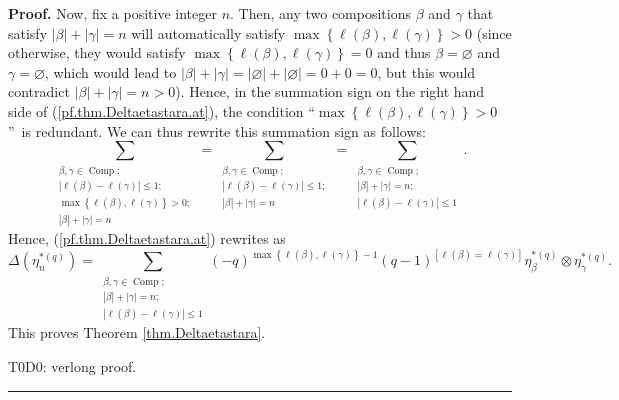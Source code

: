 \documentclass[numbers=enddot,12pt,final,onecolumn,notitlepage]{scrartcl}%
\theoremstyle{definition}
\newenvironment{proof}[1][Proof]{\noindent\textbf{#1.} }{\ \rule{0.5em}{0.5em}}
\let\sumnonlimits\sum
\renewcommand{\sum}{\sumnonlimits\limits}
\newenvironment{verlong}{}{}
\begin{document}
\begin{proof}
Now, fix a positive integer $n$. Then, any two compositions $\beta$ and
$\gamma$ that satisfy $\left\vert \beta\right\vert +\left\vert \gamma
\right\vert =n$ will automatically satisfy $\max\left\{  \ell\left(
\beta\right)  ,\ell\left(  \gamma\right)  \right\}  >0$ (since otherwise, they
would satisfy $\max\left\{  \ell\left(  \beta\right)  ,\ell\left(
\gamma\right)  \right\}  =0$ and thus $\beta=\varnothing$ and $\gamma
=\varnothing$, which would lead to $\left\vert \beta\right\vert +\left\vert
\gamma\right\vert =\left\vert \varnothing\right\vert +\left\vert
\varnothing\right\vert =0+0=0$, but this would contradict $\left\vert
\beta\right\vert +\left\vert \gamma\right\vert =n>0$). Hence, in the summation
sign on the right hand side of (\ref{pf.thm.Deltaetastara.at}), the condition
\textquotedblleft$\max\left\{  \ell\left(  \beta\right)  ,\ell\left(
\gamma\right)  \right\}  >0$\textquotedblright\ is redundant. We can thus
rewrite this summation sign as follows:%
\[
\sum_{\substack{\beta,\gamma\in\operatorname*{Comp};\\\left\vert \ell\left(
\beta\right)  -\ell\left(  \gamma\right)  \right\vert \leq1;\\\max\left\{
\ell\left(  \beta\right)  ,\ell\left(  \gamma\right)  \right\}
>0;\\\left\vert \beta\right\vert +\left\vert \gamma\right\vert =n}%
}=\sum_{\substack{\beta,\gamma\in\operatorname*{Comp};\\\left\vert \ell\left(
\beta\right)  -\ell\left(  \gamma\right)  \right\vert \leq1;\\\left\vert
\beta\right\vert +\left\vert \gamma\right\vert =n}}=\sum_{\substack{\beta
,\gamma\in\operatorname*{Comp};\\\left\vert \beta\right\vert +\left\vert
\gamma\right\vert =n;\\\left\vert \ell\left(  \beta\right)  -\ell\left(
\gamma\right)  \right\vert \leq1}}.
\]
Hence, (\ref{pf.thm.Deltaetastara.at}) rewrites as%
\[
\Delta\left(  \eta_{n}^{\ast\left(  q\right)  }\right)  =\sum_{\substack{\beta
,\gamma\in\operatorname*{Comp};\\\left\vert \beta\right\vert +\left\vert
\gamma\right\vert =n;\\\left\vert \ell\left(  \beta\right)  -\ell\left(
\gamma\right)  \right\vert \leq1}}\left(  -q\right)  ^{\max\left\{
\ell\left(  \beta\right)  ,\ell\left(  \gamma\right)  \right\}  -1}\left(
q-1\right)  ^{\left[  \ell\left(  \beta\right)  =\ell\left(  \gamma\right)
\right]  }\eta_{\beta}^{\ast\left(  q\right)  }\otimes\eta_{\gamma}%
^{\ast\left(  q\right)  }.
\]
This proves Theorem \ref{thm.Deltaetastara}. \qedhere


\begin{verlong}
T0D0: verlong proof.
\end{verlong}
\end{proof}
\end{document}

